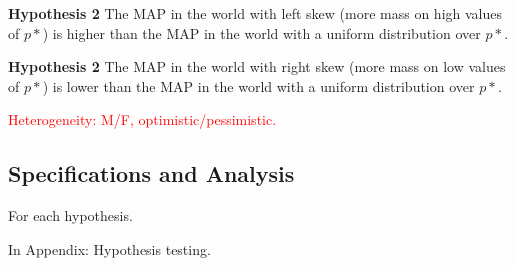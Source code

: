 \noindent \textbf{Hypothesis 2} \quad The MAP in the world with left skew (more mass on high values of $p*$) is higher than the MAP in the world with a uniform distribution over $p*$.

\noindent \textbf{Hypothesis 2} \quad The MAP in the world with right skew (more mass on low values of $p*$) is lower than the MAP in the world with a uniform distribution over $p*$.

\textcolor{red}{Heterogeneity: M/F, optimistic/pessimistic.}



\subsection{Specifications and Analysis}

For each hypothesis.

In Appendix: Hypothesis testing.

\clearpage
\pagebreak






